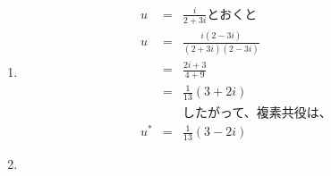 \documentclass{jsarticle}
\begin{document}
\section{}
\begin{enumerate}
\item
    \begin{eqnarray*}
      u &=& \frac{i}{2+3i} \mbox{とおくと}\\
      u &=& \frac{i(2-3i)}{(2+3i)(2-3i)}\\
      &=& \frac{2i+3}{4+9}\\
      &=& \frac{1}{13}(3+2i)\\
      &&\mbox{したがって、複素共役は、}\\
      u^* &=& \frac{1}{13}(3-2i)
    \end{eqnarray*}
  \item
\end{enumerate}
      
\end{document}
